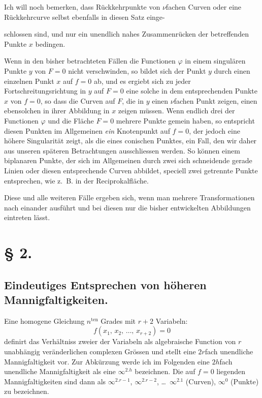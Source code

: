 \documentclass{article}
\begin{document}
Ich will noch bemerken, dass Rückkehrpunkte von $\nu$fachen Curven oder eine Rückkehrcurve selbst ebenfalls in diesen Satz einge-

schlossen sind, und nur ein unendlich nahes Zusammenrücken der betreffenden Punkte $x$ bedingen.

Wenn in den bisher betrachteten Fällen die Functionen $\varphi$ in einem singulären Punkte $y$ von $F = 0$ nicht verschwinden, so bildet sich der Punkt $y$ durch einen einzelnen Punkt $x$ auf $f = 0$ ab, und es ergiebt sich zu jeder Fortschreitungsrichtung in $y$ auf $F = 0$ eine solche in dem entsprechenden Punkte $x$ von $f = 0$, so dass die Curven auf $F$, die in $y$ einen $\nu$fachen Punkt zeigen, einen ebensolchen in ihrer Abbildung in $x$ zeigen müssen. Wenn endlich drei der Functionen $\varphi$ und die Fläche $F = 0$ mehrere Punkte gemein haben, so entspricht diesen Punkten im Allgemeinen \emph{ein} Knotenpunkt auf $f = 0$, der jedoch eine höhere Singularität zeigt, als die eines conischen Punktes, ein Fall, den wir daher aus unseren späteren Betrachtungen ausschliessen werden. So können einem biplanaren Punkte, der sich im Allgemeinen durch zwei sich schneidende gerade Linien oder diesen entsprechende Curven abbildet, speciell zwei getrennte Punkte entsprechen, wie z.~B. in der Reciprokalfläche.

Diese und alle weiteren Fälle ergeben sich, wenn man mehrere Transformationen nach einander ausführt und bei diesen nur die bisher entwickelten Abbildungen eintreten lässt.

\section*{§ 2.}

\subsection*{Eindeutiges Entsprechen von höheren Mannigfaltigkeiten.}

Eine homogene Gleichung $n^{\text{ten}}$ Grades mit $r + 2$ Variabeln:
\[
f(x_1,\, x_2,\, \dots,\, x_{r+2}) = 0
\]
definirt das Verhältniss zweier der Variabeln als algebraische Function von $r$ unabhängig veränderlichen complexen Grössen und stellt eine $2r$fach unendliche Mannigfaltigkeit vor. Zur Abkürzung werde ich im Folgenden eine $2h$fach unendliche Mannigfaltigkeit als eine $\infty^{2.h}$ bezeichnen. Die auf $f = 0$ liegenden Mannigfaltigkeiten sind dann als $\infty^{2.r-1}$, $\infty^{2.r-2}$, \dots\ $\infty^{2.1}$ (Curven), $\infty^0$ (Punkte) zu bezeichnen.
\end{document}
